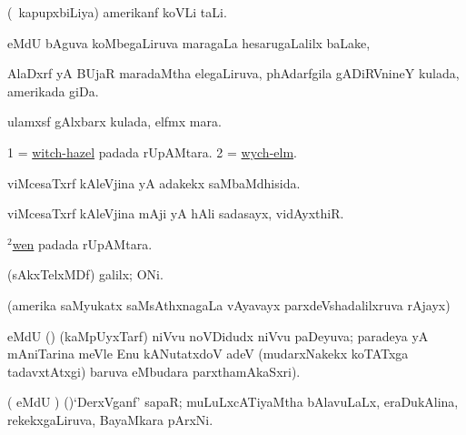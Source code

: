 \bentry
{} 
\gl{\nA}
\expl{}
\bmng
(\sA\ kapupxbiLiya) amerikanf koVLi taLi. 
\emng
\eentry

\bentry
{} 
\gl{\sapUpa}
\expl{}
\bmng
{} eMdU \parx \eng{)} bAguva koMbegaLiruva maragaLa hesarugaLalilx baLake, \udA\  
\emng
\eentry

\bentry
{} 
\gl{\nA}
\expl{}
\bmng
AlaDxrf yA BUjaR maradaMtha elegaLiruva, phAdarfgila gADiRVnineY kulada, amerikada giDa. 
\emng
\eentry

\bentry
{} 
\gl{\nA}
\expl{}
\bmng
ulamxsf gAlxbarx kulada, elfmx mara. 
\emng
\eentry

\bentry
{} 
\gl{\nA}
\expl{}
\bmng
\bnum
\num{1} = \hyperlink{witch-hazel}{witch-hazel} padada rUpAMtara. 
\num{2} = \hyperlink{wych-elm}{wych-elm}. 
\enum
\emng
\eentry

\bentry
{} 
\gl{\gu}
\expl{}
\bmng
viMcesaTxrf kAleVjina yA adakekx saMbaMdhisida. 
\emng
\eentry

\bentry
{} 
\gl{\nA}
\expl{}
\bmng
viMcesaTxrf kAleVjina mAji yA hAli sadasayx, vidAyxthiR. 
\emng
\eentry

\bentry
{} 
\gl{\nA}
\expl{}
\bmng
\hyperlink{wen(2)}{$^2$wen} padada rUpAMtara. 
\emng
\eentry

\bentry
{} 
\gl{\nA}
\expl{}
\bmng
(sAkxTelxMDf) galilx; ONi. 
\emng
\eentry

\bentry
{} 
\gl{\saMkiSx}
\expl{}
\bmng
(amerika saMyukatx saMsAthxnagaLa vAyavayx parxdeVshadalilxruva rAjayx)  
\emng
\eentry

\bentry
{} 
\gl{\gu}
\expl{}
\bmng
{} eMdU (\parx) (kaMpUyxTarf) niVvu noVDidudx niVvu paDeyuva; paradeya yA mAniTarina meVle Enu kANutatxdoV adeV (mudarxNakekx koTATxga tadavxtAtxgi) baruva  eMbudara parxthamAkaSxri). 
\emng
\eentry

\bentry
{} 
\gl{\nA}
\expl{}
\bmng
( eMdU \parx) (\vaMlAM)`DerxVganf' sapaR; muLuLxcATiyaMtha bAlavuLaLx, eraDukAlina, rekekxgaLiruva, BayaMkara pArxNi. 
\emng
\eentry

%  

